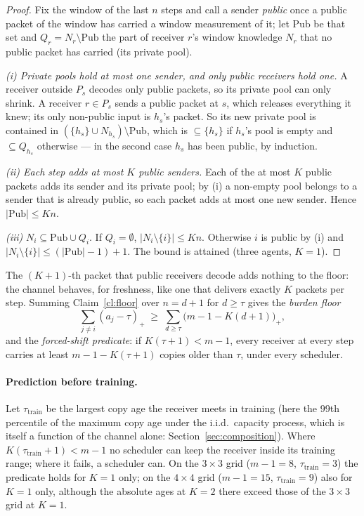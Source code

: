\begin{proof}
Fix the window of the last $n$ steps and call a sender \emph{public} once a public packet of the window has carried a
window measurement of it; let $\mathrm{Pub}$ be that set and $Q_r=N_r\setminus\mathrm{Pub}$ the part of receiver $r$'s
window knowledge $N_r$ that no public packet has carried (its private pool).

\emph{(i) Private pools hold at most one sender, and only public receivers hold one.} A receiver outside $P_s$ decodes
only public packets, so its private pool can only shrink. A receiver $r\in P_s$ sends a public packet at $s$, which
releases everything it knew; its only non-public input is $h_s$'s packet. So its new private pool is contained in
$(\{h_s\}\cup N_{h_s})\setminus\mathrm{Pub}$, which is $\subseteq\{h_s\}$ if $h_s$'s pool is empty and
$\subseteq Q_{h_s}$ otherwise --- in the second case $h_s$ has been public, by induction. 

\emph{(ii) Each step adds at most $K$ public senders.} Each of the at most $K$ public packets adds its sender and its
private pool; by (i) a non-empty pool belongs to a sender that is already public, so each packet adds at most one new
sender. Hence $|\mathrm{Pub}|\le Kn$. 

\emph{(iii)} $N_i\subseteq\mathrm{Pub}\cup Q_i$. If $Q_i=\emptyset$, $|N_i\setminus\{i\}|\le Kn$. Otherwise $i$ is public by
(i) and $|N_i\setminus\{i\}|\le(|\mathrm{Pub}|-1)+1$. 
The bound is attained (three agents, $K=1$). 
\end{proof}

The $(K{+}1)$-th packet that public receivers decode adds nothing to the floor: the channel behaves, for freshness, like
one that delivers exactly $K$ packets per step. Summing Claim~\ref{cl:floor} over $n=d+1$ for $d\ge\tau$ gives the
\emph{burden floor}
\[
\textstyle\sum_{j\ne i}(a_j-\tau)_+\;\ge\;\sum_{d\ge\tau}\bigl(m-1-K(d+1)\bigr)_+ ,
\]
and the \emph{forced-shift predicate}: if $K(\tau+1)<m-1$, every receiver at every step carries at least
$m-1-K(\tau+1)$ copies older than $\tau$, under every scheduler.

\paragraph{Prediction before training.} Let $\tau_{\mathrm{train}}$ be the largest copy age the receiver meets in training
(here the 99th percentile of the maximum copy age under the i.i.d.\ capacity process, which is itself a function of the
channel alone: Section~\ref{sec:composition}). Where $K(\tau_{\mathrm{train}}+1)<m-1$ no scheduler can keep the receiver
inside its training range; where it fails, a scheduler can. On the $3\times3$ grid ($m-1=8$, $\tau_{\mathrm{train}}=3$) the
predicate holds for $K=1$ only; on the $4\times4$ grid ($m-1=15$, $\tau_{\mathrm{train}}=9$) also for $K=1$ only, although
the absolute ages at $K=2$ there exceed those of the $3\times3$ grid at $K=1$. 

